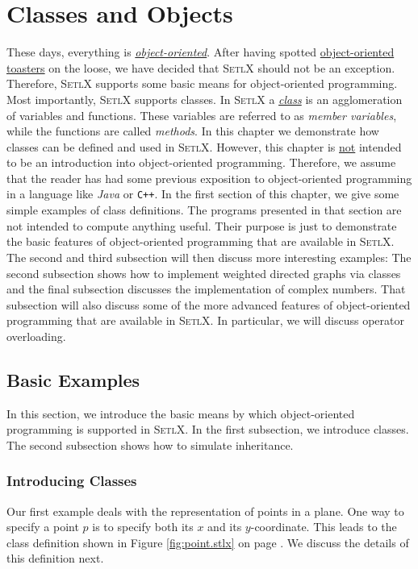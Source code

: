 \chapter{Classes and Objects}
These days, everything is
\href{http://en.wikipedia.org/wiki/Object-oriented_programming}{\emph{object-oriented}}.  
After having spotted
\href{http://www.danielsen.com/jokes/objecttoaster.txt}{object-oriented toasters}  
on the loose, we have decided that \textsc{SetlX} should not be an exception.  Therefore,
\textsc{SetlX} supports some basic means for object-oriented programming.  Most importantly,
\textsc{SetlX} supports classes.  In \textsc{SetlX} a  
\href{http://en.wikipedia.org/wiki/Class_(computer_programming)}{\emph{class}}
is an agglomeration of variables and functions.  These variables are referred to as 
\emph{member variables}, while the functions are called \emph{methods}.  
In this chapter we demonstrate how classes can be defined and used in \textsc{SetlX}.  
However, this chapter is \underline{not} intended to be an introduction into object-oriented
programming.  Therefore,  we assume that the reader 
has had some previous exposition to object-oriented programming in a language like \textsl{Java} or
\texttt{C++}.   In the first section of this chapter, we give some simple examples of class definitions.
The programs presented in that section are not intended to compute anything useful.  Their
purpose is just to demonstrate the basic features of object-oriented programming that are available
in \textsc{SetlX}.  The second  and third subsection will then discuss more interesting examples:
The second subsection shows how to implement weighted directed graphs via classes and the final
subsection discusses the implementation of complex numbers.  That subsection will also discuss
some of the more advanced features of object-oriented programming that are available in
\textsc{SetlX}.  In particular, we will discuss operator overloading.

\section{Basic Examples}
In this section, we introduce the basic means by which object-oriented programming is supported in
\textsc{SetlX}.  In the first subsection, we introduce classes.  The second subsection shows how to
simulate inheritance.

\subsection{Introducing Classes}
Our first example deals with the representation of points in a plane.  One way to specify a point
$p$ is to specify both its $x$ and its $y$-coordinate.  This leads to the class definition shown in
Figure \ref{fig:point.stlx} on page \pageref{fig:point.stlx}.  We discuss the details of this
definition next.

